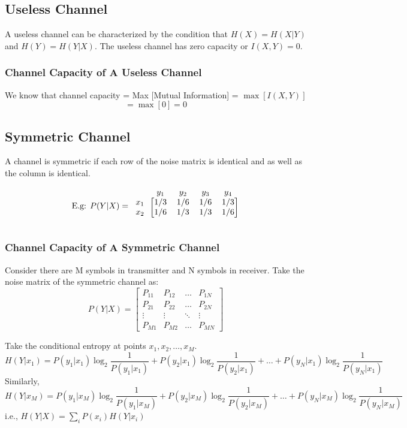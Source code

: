 \documentclass[12pt]{article}
\begin{document}
\subsection{Useless Channel}
A useless channel can be characterized by the condition that $H(X) = H(X|Y)$ and $H(Y) = H(Y|X)$. 
The useless channel has zero capacity or $I(X,Y) = 0.$ 

\subsubsection{Channel Capacity of A Useless Channel}
We know that channel capacity = Max [Mutual Information] = $\max [I(X,Y)]$ 
$$= \max [0] = 0$$ 

\subsection{Symmetric Channel}
A channel is symmetric if each row of the noise matrix is identical and as well as the column is identical. 

$$\text{E.g: } P(Y|X) = \begin{blockarray}{ccccc}
 & y_1 & y_2 & y_3 & y_4 \\
\begin{block}{c[cccc]}
x_1 & 1/3 & 1/6 & 1/6 & 1/3 \\ 
x_2 & 1/6 & 1/3 & 1/3 & 1/6 \\
\end{block}
\end{blockarray}$$

\subsubsection{Channel Capacity of A Symmetric Channel}
Consider there are M symbols in transmitter and N symbols in receiver. 
Take the noise matrix of the symmetric channel as: 
$$ P(Y|X) = \begin{bmatrix} 
P_{11} & P_{12} & \dots & P_{1N} \\ 
P_{21} & P_{22} & \dots & P_{2N} \\ 
\vdots & \vdots & \ddots & \vdots \\ 
P_{M1} & P_{M2} & \dots & P_{MN} 
\end{bmatrix} $$ 

Take the conditional entropy at points $x_1, x_2, \dots, x_M$. 
$$H(Y|x_1) = P(y_1|x_1)\log_2\frac{1}{P(y_1|x_1)} + P(y_2|x_1)\log_2\frac{1}{P(y_2|x_1)} + \dots + P(y_N|x_1)\log_2\frac{1}{P(y_N|x_1)}$$ 
Similarly, 
$$H(Y|x_M) = P(y_1|x_M)\log_2\frac{1}{P(y_1|x_M)} + P(y_2|x_M)\log_2\frac{1}{P(y_2|x_M)} + \dots + P(y_N|x_M)\log_2\frac{1}{P(y_N|x_M)}$$ 
i.e., $H(Y|X) = \sum_i P(x_i)H(Y|x_i)$ 
\end{document}
